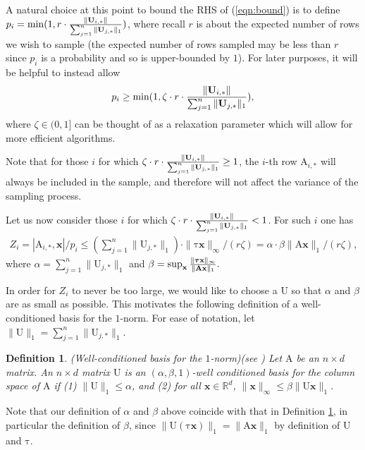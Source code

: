 \documentclass[11pt]{article}
\newtheorem{definition}[theorem]{Definition}
\newcommand{\mat}[1]{{\ensuremath{\bm{\mathrm{#1}}}}}
\def\matA{\mat{A}}
\def\matU{\mat{U}}
\def\frac#1#2{{#1\over #2}}
\def\x{{\mathbf x}}
\begin{document}
A natural choice at this point to bound the RHS of (\ref{eqn:bound}) is to define
$p_i = \min(1, r \cdot \frac{\|\matU_{i,*}\|}{\sum_{j=1}^n \|\matU_{j,*}\|_1})$, where recall $r$ is about the expected
number of rows we wish to sample (the expected number of rows sampled may be less than $r$ since $p_i$ is a 
probability and so is upper-bounded by $1$). For later purposes, it will be helpful to instead
allow 
$$p_i \geq \min(1, \zeta \cdot r \cdot \frac{\|\matU_{i,*}\|}{\sum_{j=1}^n \|\matU_{j,*}\|_1}),$$ 
where $\zeta \in (0,1]$
can be thought of as a relaxation parameter which will allow for more
efficient algorithms. 

Note that for those $i$ for which 
$\zeta \cdot r \cdot \frac{\|\matU_{i,*}\|}{\sum_{j=1}^n \|\matU_{j,*}\|_1} \geq 1$, 
the $i$-th row $\matA_{i,*}$ will always be included
in the sample, and therefore will not affect the variance of the sampling process. 

Let us now consider those $i$ for which 
$ \zeta \cdot r \cdot \frac{\|\matU_{i,*}\|}{\sum_{j=1}^n \|\matU_{j,*}\|_1} < 1$. For such $i$ 
one has
\begin{eqnarray}\label{eqn:wcb}
Z_i = |\matA_{i,*}, \x|/p_i \leq (\sum_{j=1}^n \|\matU_{j,*}\|_1) \cdot \|\mat\tau \x\|_{\infty}/(r \zeta)
= \alpha \cdot \beta \|\matA \x\|_1 / (r \zeta),
\end{eqnarray}
where $\alpha = \sum_{j=1}^n \|\matU_{j,*}\|_1$ and $\beta = \sup_{\x} \frac{\|\mat\tau \x\|_{\infty}}{\|\matA \x\|_1}.$

In order for $Z_i$ to never be too large, 
we would like to choose a $\matU$ so that $\alpha$ and $\beta$ are as small as possible. This
motivates the following definition of a well-conditioned basis for the $1$-norm. For ease of notation,
let $\|\matU\|_1 = \sum_{j=1}^n \|\matU_{j,*}\|_1$. 

\begin{definition}(Well-conditioned basis for the $1$-norm)\label{def:wcb}(see \cite{DDHKM09})
Let $\matA$ be an $n \times d$ matrix. An $n \times d$ matrix $\matU$ is an $(\alpha, \beta,1)$-well conditioned
basis for the column space of $\matA$ if (1) $\|\matU\|_1 \leq \alpha$, and (2) for all $\x \in \mathbb{R}^d$,
$\|\x\|_{\infty} \leq \beta \|\matU \x\|_1$. 
\end{definition}
Note that our definition of $\alpha$ and $\beta$ above coincide with that in Definition \ref{def:wcb},
in particular the definition of $\beta$, 
since $\|\matU(\mat\tau \x)\|_1 = \|\matA \x\|_1$ by definition of $\matU$ and $\mat\tau$. 
\end{document}
